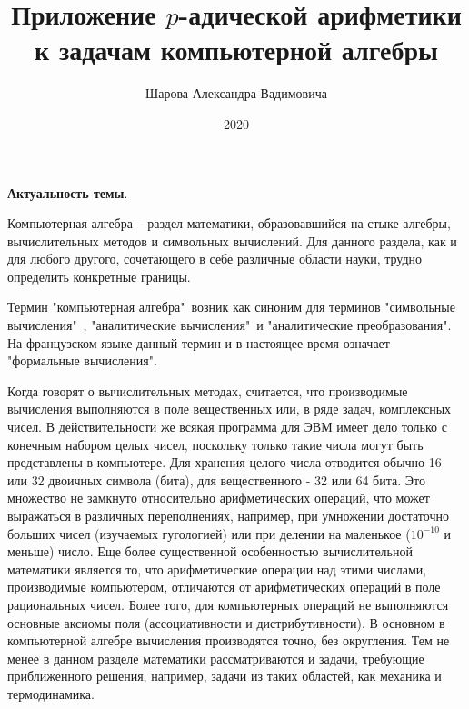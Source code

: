 \documentclass[master, och, autoref, times]{sty/SCWorks}
\theoremstyle{plain}
\theoremstyle{definition}
\numberwithin{equation}{section}
\begin{document}
\title{Приложение $p$-адической арифметики к задачам компьютерной алгебры}

\author{Шарова Александра Вадимовича}



\date{2020}

\maketitle

\intro

\textbf{Актуальность темы}.

Компьютерная алгебра -- раздел математики, образовавшийся на стыке алгебры, вычислительных методов и символьных вычислений. Для данного раздела, как и для любого другого, сочетающего в себе различные области науки, трудно определить конкретные границы.

Термин "компьютерная алгебра"\ возник как синоним для терминов "символьные вычисления"\ , "аналитические вычисления"\ и "аналитические преобразования". На французском языке данный термин и в настоящее время означает "формальные вычисления".

Когда говорят о вычислительных методах, считается, что \mbox{производимые} вычисления выполняются в поле вещественных или, в ряде задач, комплексных чисел. В действительности же всякая программа для ЭВМ имеет дело только с конечным набором целых чисел, \mbox{поскольку} только такие числа могут быть представлены в компьютере. Для \mbox{хранения} целого числа отводится обычно 16 или 32 двоичных символа (бита), для вещественного - 32 или 64 бита. Это множество не замкнуто \mbox{относительно} арифметических операций, что может выражаться в различных \mbox{переполнениях}, например, при умножении достаточно больших чисел (изучаемых гугологией) или при делении на маленькое ($10^{-10}$ и меньше) число. Еще более  существенной особенностью вычислительной математики является то, что арифметические операции над этими числами, производимые \mbox{компьютером}, отличаются от арифметических операций в поле рациональных чисел. Более того, для компьютерных операций не выполняются основные аксиомы поля (ассоциативности и дистрибутивности). В основном в компьютерной алгебре вычисления производятся точно, без округления. Тем не менее в данном разделе математики рассматриваются и задачи, требующие \mbox{приближенного} решения, например, задачи из таких областей, как механика и термодинамика.
\end{document}
